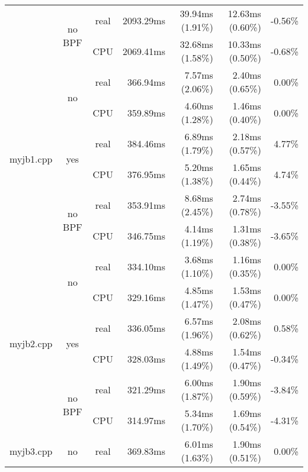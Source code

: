 \documentclass[en]{pracamgr}
\begin{document}
\begin{small}
\begin{longtable}{|l|c|c|r|r|r|r|}
                            \cline{2-7}
                            & \multirow{2}{*}{no BPF} & real & 2093.29ms & 39.94ms (1.91\%) & 12.63ms (0.60\%) & -0.56\% \\*
                            &                         & CPU  & 2069.41ms & 32.68ms (1.58\%) & 10.33ms (0.50\%) & -0.68\% \\
\hline
\multirow{6}{*}{myjb1.cpp}  & \multirow{2}{*}{no}     & real & 366.94ms & 7.57ms (2.06\%) & 2.40ms (0.65\%) & 0.00\% \\*
                            &                         & CPU  & 359.89ms & 4.60ms (1.28\%) & 1.46ms (0.40\%) & 0.00\% \\*
                            \cline{2-7}
                            & \multirow{2}{*}{yes}    & real & 384.46ms & 6.89ms (1.79\%) & 2.18ms (0.57\%) & 4.77\% \\*
                            &                         & CPU  & 376.95ms & 5.20ms (1.38\%) & 1.65ms (0.44\%) & 4.74\% \\*
                            \cline{2-7}
                            & \multirow{2}{*}{no BPF} & real & 353.91ms & 8.68ms (2.45\%) & 2.74ms (0.78\%) & -3.55\% \\*
                            &                         & CPU  & 346.75ms & 4.14ms (1.19\%) & 1.31ms (0.38\%) & -3.65\% \\
\hline
\multirow{6}{*}{myjb2.cpp}  & \multirow{2}{*}{no}     & real & 334.10ms & 3.68ms (1.10\%) & 1.16ms (0.35\%) & 0.00\% \\*
                            &                         & CPU  & 329.16ms & 4.85ms (1.47\%) & 1.53ms (0.47\%) & 0.00\% \\*
                            \cline{2-7}
                            & \multirow{2}{*}{yes}    & real & 336.05ms & 6.57ms (1.96\%) & 2.08ms (0.62\%) & 0.58\% \\*
                            &                         & CPU  & 328.03ms & 4.88ms (1.49\%) & 1.54ms (0.47\%) & -0.34\% \\*
                            \cline{2-7}
                            & \multirow{2}{*}{no BPF} & real & 321.29ms & 6.00ms (1.87\%) & 1.90ms (0.59\%) & -3.84\% \\*
                            &                         & CPU  & 314.97ms & 5.34ms (1.70\%) & 1.69ms (0.54\%) & -4.31\% \\
\hline
\multirow{6}{*}{myjb3.cpp}  & \multirow{2}{*}{no}     & real & 369.83ms & 6.01ms (1.63\%) & 1.90ms (0.51\%) & 0.00\% \\*

\end{longtable}
\end{small}
\end{document}
